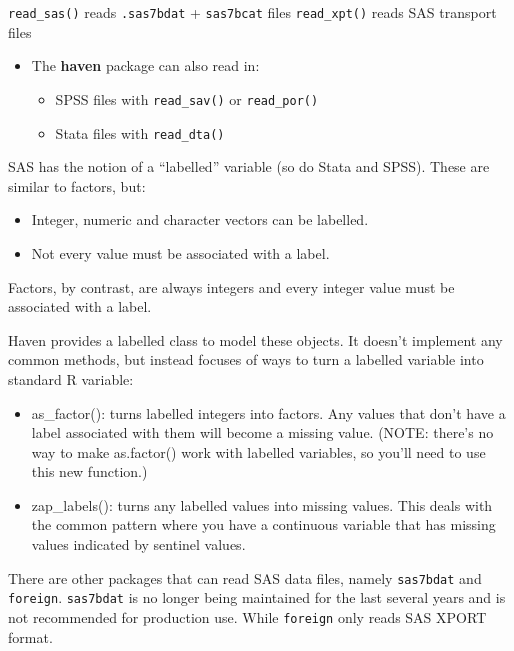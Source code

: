 \documentclass[]{book}
\providecommand{\tightlist}{%
  \setlength{\itemsep}{0pt}\setlength{\parskip}{0pt}}
\newenvironment{rmdblock}[1]
  {\begin{shaded*}
  \begin{itemize}
  \renewcommand{\labelitemi}{
    \raisebox{-.7\height}[0pt][0pt]{
      {\setkeys{Gin}{width=3em,keepaspectratio}\texttt{[image: images/\#1]}}
    }
  }
  \item
  }
  {
  \end{itemize}
  \end{shaded*}
  }
\newenvironment{rmdnote}
  {\begin{rmdblock}{note}}
  {\end{rmdblock}}
\theoremstyle{definition}
\theoremstyle{definition}
\theoremstyle{definition}
\theoremstyle{remark}
\let\BeginKnitrBlock\begin \let\EndKnitrBlock\end
\begin{document}
\texttt{read\_sas()} reads \texttt{.sas7bdat} + \texttt{sas7bcat} files
\texttt{read\_xpt()} reads SAS transport files

\begin{rmdnote}
The \textbf{haven} package can also read in:

\begin{itemize}
\tightlist
\item
  SPSS files with \texttt{read\_sav()} or \texttt{read\_por()}
\item
  Stata files with \texttt{read\_dta()}
\end{itemize}
\end{rmdnote}

SAS has the notion of a ``labelled'' variable (so do Stata and SPSS).
These are similar to factors, but:

\begin{itemize}
\item
  Integer, numeric and character vectors can be labelled.
\item
  Not every value must be associated with a label.
\end{itemize}

Factors, by contrast, are always integers and every integer value must
be associated with a label.

Haven provides a labelled class to model these objects. It doesn't
implement any common methods, but instead focuses of ways to turn a
labelled variable into standard R variable:

\begin{itemize}
\item
  as\_factor(): turns labelled integers into factors. Any values that
  don't have a label associated with them will become a missing value.
  (NOTE: there's no way to make as.factor() work with labelled
  variables, so you'll need to use this new function.)
\item
  zap\_labels(): turns any labelled values into missing values. This
  deals with the common pattern where you have a continuous variable
  that has missing values indicated by sentinel values.
\end{itemize}

\BeginKnitrBlock{rmdwarning}
There are other packages that can read SAS data files, namely
\texttt{sas7bdat} and \texttt{foreign}. \texttt{sas7bdat} is no longer
being maintained for the last several years and is not recommended for
production use. While \texttt{foreign} only reads SAS XPORT format.
\EndKnitrBlock{rmdwarning}
\end{document}
